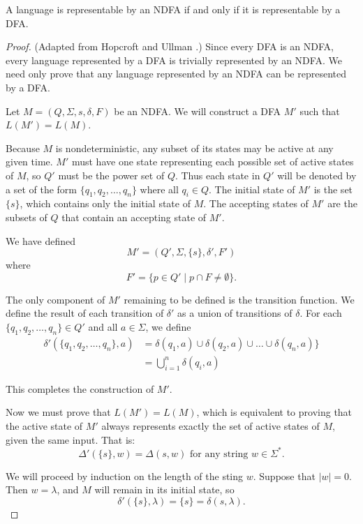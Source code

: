 \documentclass{bcthesis}
\newcommand{\footcite}[2]{\xspace\cite[pg.~{#2}]{#1}\xspace}
\begin{document}
	\begin{claim}
	\label{prop:ndfa_dfa_equivalent}
		A language is representable by an NDFA if and only if it is representable by a DFA.
	\end{claim}
	\begin{proof}
	\label{proof:ndfa_dfa_equivalent}
		(Adapted from Hopcroft and Ullman \footcite{hopcroft}{22}.)
		Since every DFA is an NDFA, every language represented by a DFA is trivially represented by an NDFA.
		We need only prove that any language represented by an NDFA can be represented by a DFA.

		Let $M = (Q, \Sigma, s, \delta, F)$ be an NDFA.
		We will construct a DFA $M'$ such that $L(M') = L(M)$.

		Because $M$ is nondeterministic, any subset of its states may be active at any given time.
		$M'$ must have one state representing each possible set of active states of $M$, so $Q'$ must be the power set of $Q$.
		Thus each state in $Q'$ will be denoted by a set of the form $\{ q_1, q_2, \dots, q_n \}$ where all $q_i \in Q$.
		The initial state of $M'$ is the set $\{ s \}$, which contains only the initial state of $M$.
		The accepting states of $M'$ are the subsets of $Q$ that contain an accepting state of $M'$.

		We have defined
		\[
			M' = (Q', \Sigma, \{s\}, \delta', F')
		\]
		where
		\[
			F' = \{ p \in Q' \mid p \cap F \neq \emptyset\}.
		\]

		The only component of $M'$ remaining to be defined is the transition function.
		We define the result of each transition of $\delta'$ as a union of transitions of $\delta$.
		For each $\{ q_1, q_2, \dots, q_n \} \in Q'$ and all $a \in \Sigma$, we define
		\begin{align*}
			\delta'(\{ q_1, q_2, \dots, q_n \}, a) &= \delta(q_1, a) \cup \delta(q_2, a) \cup \dots \cup \delta(q_n, a) \} \\
			&= \bigcup_{i=1}^n \delta(q_i, a)
		\end{align*}
		
		This completes the construction of $M'$.

		Now we must prove that $L(M') = L(M)$, which is equivalent to proving that the active state of $M'$ always represents exactly the set of active states of $M$, given the same input.
		That is:
		\[
			\Delta'(\{ s \}, w) = \Delta(s, w) \text{ for any string } w \in \Sigma^*.
		\]
		
		We will proceed by induction on the length of the sting $w$.
		Suppose that $|w| = 0$.
		Then $w = \lambda$, and $M$ will remain in its initial state, so 
		\[
			\delta'(\{ s \}, \lambda) = \{ s \} = \delta(s, \lambda).
		\]


\end{proof}
\end{document}
